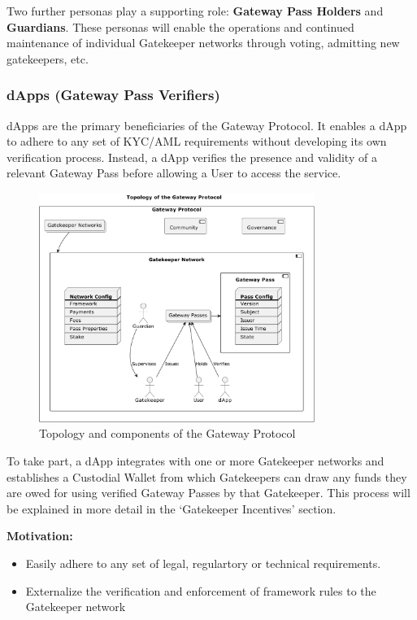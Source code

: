 Two further personas play a supporting role: \textbf{Gateway Pass Holders} and \textbf{Guardians}. These personas will enable the operations and continued maintenance of individual Gatekeeper networks through voting, admitting new gatekeepers, etc.

\subsubsection{dApps (Gateway Pass Verifiers)}
dApps are the primary beneficiaries of the Gateway Protocol. It enables a dApp to adhere to any set of KYC/AML requirements without developing its own verification process. Instead, a dApp verifies the presence and validity of a relevant Gateway Pass before allowing a User to access the service.

\begin{figure}[h]
  \begin{center}
    \centering
    \includegraphics[width=0.8\textwidth]{figures/02-solution-topology.pdf}
    \caption[Fig 3]{Topology and components of the Gateway Protocol}
  \end{center}
\end{figure}

To take part, a dApp integrates with one or more Gatekeeper networks and establishes a Custodial Wallet from which Gatekeepers can draw any funds they are owed for using verified Gateway Passes by that Gatekeeper. This process will be explained in more detail in the ‘Gatekeeper Incentives’ section.

\vspace{1em}

\textbf{Motivation:}
\begin{itemize}
\item Easily adhere to any set of legal, regulartory or technical requirements.
\item Externalize the verification and enforcement of framework rules to the Gatekeeper network
\end{itemize}

